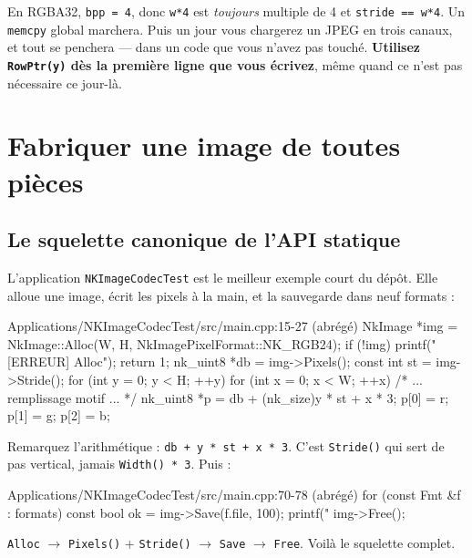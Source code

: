 \begin{nkpiege}
En RGBA32, \texttt{bpp = 4}, donc \texttt{w*4} est \emph{toujours} multiple de 4
et \texttt{stride == w*4}. Un \texttt{memcpy} global marchera. Puis un jour vous
chargerez un JPEG en trois canaux, et tout se penchera — dans un code que vous
n'avez pas touché. \textbf{Utilisez \texttt{RowPtr(y)} dès la première ligne que
vous écrivez}, même quand ce n'est pas nécessaire ce jour-là.
\end{nkpiege}

\section{Fabriquer une image de toutes pièces}

\subsection{Le squelette canonique de l'API statique}

L'application \texttt{NKImageCodecTest} est le meilleur exemple court du dépôt.
Elle alloue une image, écrit les pixels à la main, et la sauvegarde dans neuf
formats :

\begin{nkcode}{Applications/NKImageCodecTest/src/main.cpp:15-27 (abrégé)}
    NkImage *img = NkImage::Alloc(W, H, NkImagePixelFormat::NK_RGB24);
    if (!img) {
        printf("[ERREUR] Alloc\n");
        return 1;
    }
    nk_uint8 *db = img->Pixels();
    const int st = img->Stride();
    for (int y = 0; y < H; ++y) {
        for (int x = 0; x < W; ++x) {
            /* ... remplissage motif ... */
            nk_uint8 *p = db + (nk_size)y * st + x * 3;
            p[0] = r; p[1] = g; p[2] = b;
        }
    }
\end{nkcode}

Remarquez l'arithmétique : \texttt{db + y * st + x * 3}. C'est \texttt{Stride()}
qui sert de pas vertical, jamais \texttt{Width() * 3}. Puis :

\begin{nkcode}{Applications/NKImageCodecTest/src/main.cpp:70-78 (abrégé)}
    for (const Fmt &f : formats) {
        const bool ok = img->Save(f.file, 100);
        printf("  %
    }
    img->Free();
\end{nkcode}

\texttt{Alloc} $\rightarrow$ \texttt{Pixels()} + \texttt{Stride()} $\rightarrow$
\texttt{Save} $\rightarrow$ \texttt{Free}. Voilà le squelette complet.

